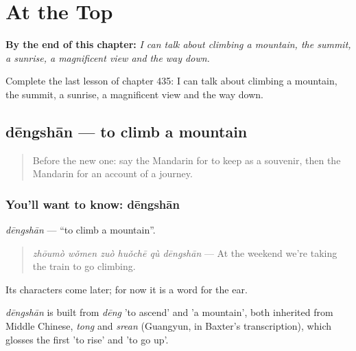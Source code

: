 
\chapter{At the Top}
\label{ch:zh-at-the-top}

\begin{chapteropening}
\textbf{By the end of this chapter:} \emph{I can talk about climbing a mountain, the summit, a sunrise, a magnificent view and the way down.}

Complete the last lesson of chapter 435: I can talk about climbing a mountain, the summit, a sunrise, a magnificent view and the way down.
\end{chapteropening}

\section[dēngshān]{dēngshān — to climb a mountain}

\label{lesson:ZH-C435-dengshan}



\begin{quote}
Before the new one: say the Mandarin for to keep as a souvenir, then the Mandarin for an account of a journey.
\end{quote}

\subsection*{You'll want to know: dēngshān}
\emph{dēngshān} — \textquotedblleft{}to climb a mountain\textquotedblright{}.

\begin{quote}
\emph{zhōumò wǒmen zuò huǒchē qù dēngshān} — At the weekend we're taking the train to go climbing.
\end{quote}

Its characters come later; for now it is a word for the ear.

\begin{cousinweb}
\emph{dēngshān} is built from \emph{dēng} 'to ascend' and  'a mountain', both inherited from Middle Chinese, \emph{tong} and \emph{srean} (Guangyun, in Baxter's transcription), which glosses the first 'to rise' and 'to go up'.
\end{cousinweb}

